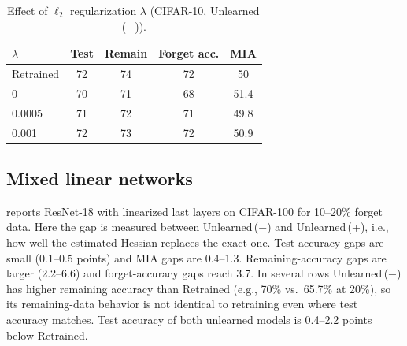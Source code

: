 \documentclass[10pt,twocolumn,letterpaper]{article}
\begin{document}
\begin{table}[t]
  \centering
  \small
  \begin{tabular}{@{}lcccc@{}}
    \toprule
    $\lambda$ & Test & Remain & Forget acc. & MIA \\
    \midrule
    Retrained & 72 & 74 & 72 & 50 \\
    0 & 70 & 71 & 68 & 51.4 \\
    0.0005 & 71 & 72 & 71 & 49.8 \\
    0.001 & 72 & 73 & 72 & 50.9 \\
    \bottomrule
  \end{tabular}
  \caption{Effect of $\ell_2$ regularization $\lambda$ (CIFAR-10, Unlearned\,($-$)).}
  \label{tab:lambda}
\end{table}

\subsection{Mixed linear networks}
 reports ResNet-18 with linearized last layers on CIFAR-100 for 10--20\% forget data. Here the gap is measured between Unlearned\,($-$) and Unlearned\,(+), i.e., how well the estimated Hessian replaces the exact one. Test-accuracy gaps are small (0.1--0.5 points) and MIA gaps are 0.4--1.3. Remaining-accuracy gaps are larger (2.2--6.6) and forget-accuracy gaps reach 3.7. In several rows Unlearned\,($-$) has higher remaining accuracy than Retrained (e.g., 70\% vs.\ 65.7\% at 20\%), so its remaining-data behavior is not identical to retraining even where test accuracy matches. Test accuracy of both unlearned models is 0.4--2.2 points below Retrained.
\end{document}
